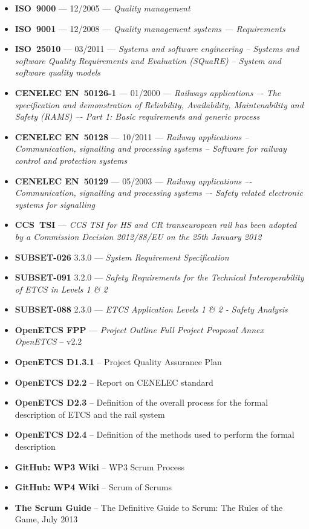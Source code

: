 \begin{itemize}
\item \textbf{ISO~9000} --- 12/2005 --- \emph{Quality management}
\item \textbf{ISO~9001} --- 12/2008 --- \emph{Quality management systems — Requirements}
\item \textbf{ISO~25010} --- 03/2011 --- \emph{Systems and software engineering -- Systems and software Quality Requirements and Evaluation (SQuaRE) -- System and software quality models}
\item \textbf{CENELEC EN~50126-1} --- 01/2000 --- \emph{Railways applications –- The specification and 
demonstration of Reliability, Availability, Maintenability and Safety (RAMS) –- Part 1: 
Basic requirements and generic process}
\item \textbf{CENELEC EN~50128} --- 10/2011 --- \emph{Railway applications -- Communication, signalling and 
processing systems -- Software for railway control and protection systems}
\item \textbf{CENELEC EN~50129} --- 05/2003 --- \emph{Railway applications –- Communication, signalling and 
processing systems –- Safety related electronic systems for signalling}
\item \textbf{CCS~TSI} --- \emph{ CCS TSI for HS and CR transeuropean rail has been adopted by a Commission Decision 2012/88/EU on the 25th January 2012}
\item \textbf{SUBSET-026} 3.3.0 --- \emph{System Requirement Specification}
\item \textbf{SUBSET-091} 3.2.0 --- \emph{Safety Requirements for the Technical Interoperability
of ETCS in Levels 1 \& 2}
\item \textbf{SUBSET-088} 2.3.0 --- \emph{ETCS Application Levels 1 \& 2 - Safety Analysis}
\item \textbf{OpenETCS FPP} --- \emph{Project Outline Full Project Proposal Annex OpenETCS} -- v2.2
\item \textbf{OpenETCS D1.3.1} -- Project Quality Assurance Plan
\item \textbf{OpenETCS D2.2} -- Report on CENELEC standard
\item \textbf{OpenETCS D2.3} -- Definition of the overall process for the formal description of ETCS and the rail system 
\item \textbf{OpenETCS D2.4} -- Definition of the methods used to perform the formal description
\item \textbf{GitHub: WP3 Wiki } -- WP3 Scrum Process
\item \textbf{GitHub: WP4 Wiki } -- Scrum of Scrums
\item \textbf{The Scrum Guide} -- The Definitive Guide to Scrum: The Rules of the Game, July 2013

\end{itemize}


